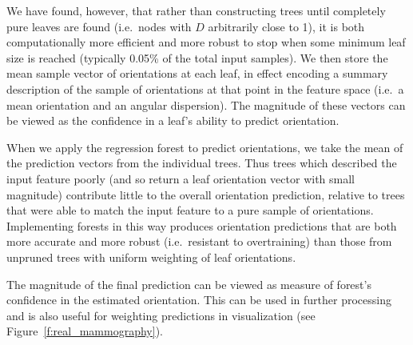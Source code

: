 \documentclass[runningheads,a4paper]{llncs}
\newcommand{\fref}[1]{Figure~\ref{#1}}
\def\dtcwt{DT-$\mathbb{C}$WT}
\def\ie{i.e.}
\newcommand{\comment}[1]{}
\begin{document}
We have found, however, that rather than constructing trees until completely pure leaves are found (\ie~nodes with $D$ arbitrarily close to 1), it is both computationally more efficient and more robust to stop when some minimum leaf size is reached (typically 0.05\% of the total input samples). We then store the mean sample vector of orientations at each leaf, in effect encoding a summary description of the sample of orientations at that point in the feature space (\ie~a mean orientation and an angular dispersion). The magnitude of these vectors can be viewed as the confidence in a leaf's ability to predict orientation.

When we apply the regression forest to predict orientations, we take the mean of the prediction vectors from the individual trees. Thus trees which described the input feature poorly (and so return a leaf orientation vector with small magnitude) contribute little to the overall orientation prediction, relative to trees that were able to match the input feature to a pure sample of orientations. Implementing forests in this way produces orientation predictions that are both more accurate and more robust (\ie~resistant to overtraining) than those from unpruned trees with uniform weighting of leaf orientations.

The magnitude of the final prediction can be viewed as measure of forest's confidence in the estimated orientation. This can be used in further processing and is also useful for weighting predictions in visualization (see \fref{f:real_mammography}).


\comment{
\item When estimating orientation with a tree (or forest of trees), there is a particular problem when the output is limited to a specific range e.g. (0,2pi]. At the two extremes of the range, samples in the bins near the end are biased toward the centre of the range such that, in our case, it is very unlikely that a 0 or 2pi will be output by the forest.
Random Forests (or trees for that matter) have the option of giving us a multimodal distribution over orientation which will be useful at points where lines cross.
One advantage of the (pruned) tree approach is that each bin contains a number of training samples such that we can estimate a mean value and an uncertainty (variance) for every leaf. In other words, the variance is very much data dependent.
This then propagates in the case of a Random Forest since the individual tree outputs can be combined with their respective variance accounted for correctly.
The output from the Random Forest is always between 0 and 1 in magnitude. Question: should we be taking the square root of the complex vector to halve the angle (and therefore sqrt the magnitude also)? At the moment, vectors are weighed by their unsquared magnitude.
}
\end{document}
